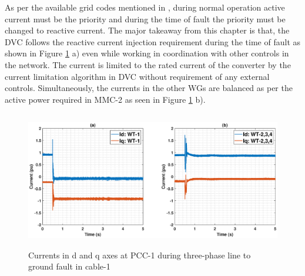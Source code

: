 As per the available grid codes mentioned in \cite{mohseni_review_2012}, during normal operation active current must be the priority and during the time of fault the priority must be changed to reactive current. The major takeaway from this chapter is that, the \gls{DVC} follows the reactive current injection requirement during the time of fault as shown in Figure \ref{18_3phaseSC} a) even while working in coordination with other controls in the network. The current is limited to the rated current of the converter by the current limitation algorithm in \gls{DVC} without requirement of any external controls. Simultaneously, the currents in the other \gls{WG}s are balanced as per the active power required in \gls{MMC}-2 as seen in Figure \ref{18_3phaseSC} b). 
\vspace{-3mm}
\begin{figure}[H]
\hspace*{-1.2cm}
    \includegraphics[height = 6cm,width = 17.25cm]{Diagrams/Chapter_5/IDQ_WT1234_3phaseSC.eps}
    \caption{Currents in d and q axes at PCC-1 during three-phase line to ground fault in cable-1}
    \label{18_3phaseSC}
\end{figure}
